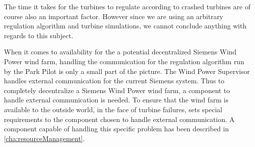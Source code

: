 %
%

The time it takes for the turbines to regulate according to crashed turbines are of course also an important factor. However since we are using an arbitrary regulation algorithm and turbine simulations, we cannot conclude anything with regards to this subject.


When it comes to availability for the a potential decentralized Siemens Wind Power wind farm, handling the communication for the regulation algorithm run by the Park Pilot is only a small part of the picture. The Wind Power Supervisor handles external communication for the current Siemens system. Thus to completely decentralize a Siemens Wind Power wind farm, a component to handle external communication is needed. To ensure that the wind farm is available to the outside world, in the face of turbine failures, sets special requirements to the component chosen to handle external communication. A component capable of handling this specific problem has been described in \cref{cha:resourceManagement}.

